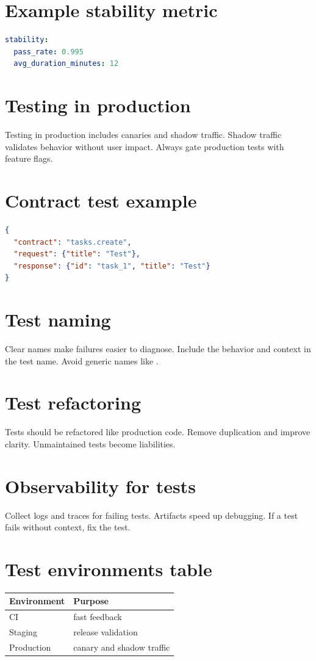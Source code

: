 \section{Example stability metric}
\begin{lstlisting}[language=YAML]
stability:
  pass_rate: 0.995
  avg_duration_minutes: 12
\end{lstlisting}

\section{Testing in production}
Testing in production includes canaries and shadow traffic.
Shadow traffic validates behavior without user impact.
Always gate production tests with feature flags.

\section{Contract test example}
\begin{lstlisting}[language=JSON]
{
  "contract": "tasks.create",
  "request": {"title": "Test"},
  "response": {"id": "task_1", "title": "Test"}
}
\end{lstlisting}

\section{Test naming}
Clear names make failures easier to diagnose.
Include the behavior and context in the test name.
Avoid generic names like .

\section{Test refactoring}
Tests should be refactored like production code.
Remove duplication and improve clarity.
Unmaintained tests become liabilities.

\section{Observability for tests}
Collect logs and traces for failing tests.
Artifacts speed up debugging.
If a test fails without context, fix the test.

\section{Test environments table}
\begin{tabularx}{\textwidth}{@{}lX@{}}
\toprule
Environment & Purpose \\
\midrule
CI & fast feedback \\
Staging & release validation \\
Production & canary and shadow traffic \\
\bottomrule
\end{tabularx}

